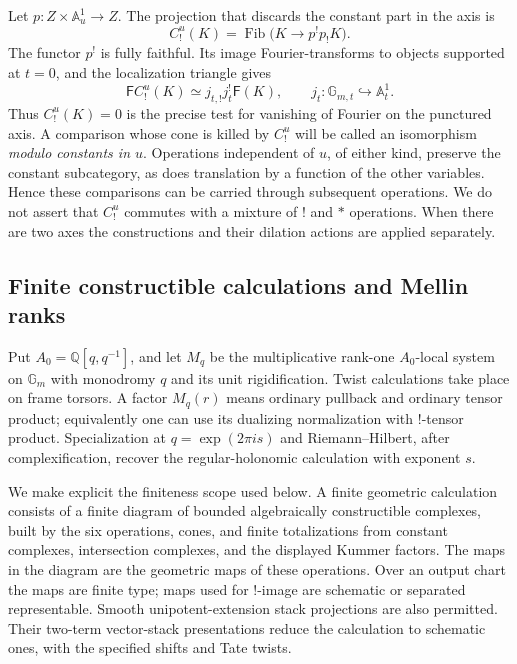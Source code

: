 Let $p:Z\times\mathbb A^1_u\to Z$.  The projection that discards the
constant part in the axis is
\begin{equation}\label{eq:pre-axis-projection}
 C_!^u(K)=\operatorname{Fib}\bigl(K\longrightarrow p^!p_!K\bigr).
\end{equation}
The functor $p^!$ is fully faithful.  Its image Fourier-transforms to
objects supported at $t=0$, and the localization triangle gives
\[
 \mathsf F C_!^u(K)\simeq j_{t,!}j_t^!\mathsf F(K),
 \qquad j_t:\mathbb G_{m,t}\hookrightarrow\mathbb A^1_t.
\]
Thus $C_!^u(K)=0$ is the precise test for vanishing of Fourier on the
punctured axis.  A comparison whose cone is killed by $C_!^u$ will be
called an isomorphism \emph{modulo constants in $u$}.  Operations
independent of $u$, of either kind, preserve the constant subcategory,
as does translation by a function of the other variables.  Hence
these comparisons can be carried through subsequent operations.
We do not assert that $C_!^u$ commutes with a mixture of $!$ and $*$
operations.  When there are two axes the constructions and their
dilation actions are applied separately.

\subsection{Finite constructible calculations and Mellin ranks}

Put $A_0=\mathbb Q[q,q^{-1}]$, and let $M_q$ be the multiplicative
rank-one $A_0$-local system on $\mathbb G_m$ with monodromy $q$ and
its unit rigidification.  Twist calculations take place on frame
torsors.  A factor $M_q(r)$ means ordinary pullback and ordinary
tensor product; equivalently one can use its dualizing normalization
with $!$-tensor product.  Specialization at
$q=\exp(2\pi i s)$ and Riemann--Hilbert, after complexification,
recover the regular-holonomic calculation with exponent $s$.

We make explicit the finiteness scope used below.  A finite geometric
calculation consists of a finite diagram of bounded algebraically
constructible complexes, built by the six operations, cones, and
finite totalizations from constant complexes, intersection complexes,
and the displayed Kummer factors.  The maps in the diagram are the
geometric maps of these operations.  Over an output chart the maps
are finite type; maps used for $!$-image are schematic or separated
representable.  Smooth unipotent-extension stack projections are
also permitted.  Their two-term vector-stack presentations reduce
the calculation to schematic ones, with the specified shifts and
Tate twists.

